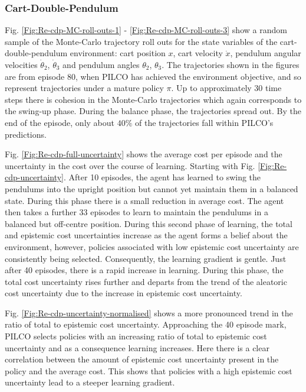 \subsubsection{Cart-Double-Pendulum}
Fig. \ref{Fig:Re-cdp-MC-roll-outs-1} - \ref{Fig:Re-cdp-MC-roll-outs-3} show a random sample of the Monte-Carlo trajectory roll outs for the state variables of the cart-double-pendulum environment: cart position $x$, cart velocity $\dot x$, pendulum angular velocities $\dot{\theta}_{2}$, $\dot{\theta}_{3}$ and pendulum angles $\theta_{2}$, $\theta_{3}$. The trajectories shown in the figures are from episode 80, when PILCO has achieved the environment objective, and so represent trajectories under a mature policy $\pi$. Up to approximately 30 time steps there is cohesion in the Monte-Carlo trajectories which again corresponds to the swing-up phase. During the balance phase, the trajectories spread out. By the end of the episode, only about $40\%$ of the trajectories fall within PILCO's predictions. 

Fig. \ref{Fig:Re-cdp-full-uncertainty} shows the average cost per episode and the uncertainty in the cost over the course of learning. Starting with Fig. \ref{Fig:Re-cdp-uncertainty}. After 10 episodes, the agent has learned to swing the pendulums into the upright position but cannot yet maintain them in a balanced state. During this phase there is a small reduction in average cost. The agent then takes a further 33 episodes to learn to maintain the pendulums in a balanced but off-centre position. During this second phase of learning, the total and epistemic cost uncertainties increase as the agent forms a belief about the environment, however, policies associated with low epistemic cost uncertainty are consistently being selected. Consequently, the learning gradient is gentle. Just after 40 episodes, there is a rapid increase in learning. During this phase, the total cost uncertainty rises further and departs from the trend  of the aleatoric cost uncertainty due to the increase in epistemic cost uncertainty. 

Fig. \ref{Fig:Re-cdp-uncertainty-normalised} shows a more pronounced trend in the ratio of total to epistemic cost uncertainty. Approaching the 40 episode mark, PILCO selects policies with an increasing ratio of total to epistemic cost uncertainty and as a consequence learning increases. Here there is a clear correlation between the amount of epistemic cost uncertainty present in the policy and the average cost. This shows that policies with a high epistemic cost uncertainty lead to a steeper learning gradient. 

